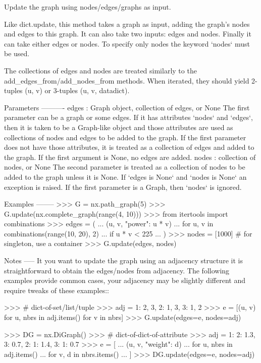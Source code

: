 \begin{DoxyVerb}Update the graph using nodes/edges/graphs as input.

Like dict.update, this method takes a graph as input, adding the
graph's nodes and edges to this graph. It can also take two inputs:
edges and nodes. Finally it can take either edges or nodes.
To specify only nodes the keyword `nodes` must be used.

The collections of edges and nodes are treated similarly to
the add_edges_from/add_nodes_from methods. When iterated, they
should yield 2-tuples (u, v) or 3-tuples (u, v, datadict).

Parameters
----------
edges : Graph object, collection of edges, or None
    The first parameter can be a graph or some edges. If it has
    attributes `nodes` and `edges`, then it is taken to be a
    Graph-like object and those attributes are used as collections
    of nodes and edges to be added to the graph.
    If the first parameter does not have those attributes, it is
    treated as a collection of edges and added to the graph.
    If the first argument is None, no edges are added.
nodes : collection of nodes, or None
    The second parameter is treated as a collection of nodes
    to be added to the graph unless it is None.
    If `edges is None` and `nodes is None` an exception is raised.
    If the first parameter is a Graph, then `nodes` is ignored.

Examples
--------
>>> G = nx.path_graph(5)
>>> G.update(nx.complete_graph(range(4, 10)))
>>> from itertools import combinations
>>> edges = (
...     (u, v, {"power": u * v})
...     for u, v in combinations(range(10, 20), 2)
...     if u * v < 225
... )
>>> nodes = [1000]  # for singleton, use a container
>>> G.update(edges, nodes)

Notes
-----
It you want to update the graph using an adjacency structure
it is straightforward to obtain the edges/nodes from adjacency.
The following examples provide common cases, your adjacency may
be slightly different and require tweaks of these examples::

>>> # dict-of-set/list/tuple
>>> adj = {1: {2, 3}, 2: {1, 3}, 3: {1, 2}}
>>> e = [(u, v) for u, nbrs in adj.items() for v in nbrs]
>>> G.update(edges=e, nodes=adj)

>>> DG = nx.DiGraph()
>>> # dict-of-dict-of-attribute
>>> adj = {1: {2: 1.3, 3: 0.7}, 2: {1: 1.4}, 3: {1: 0.7}}
>>> e = [
...     (u, v, {"weight": d})
...     for u, nbrs in adj.items()
...     for v, d in nbrs.items()
... ]
>>> DG.update(edges=e, nodes=adj)


\end{DoxyVerb}
